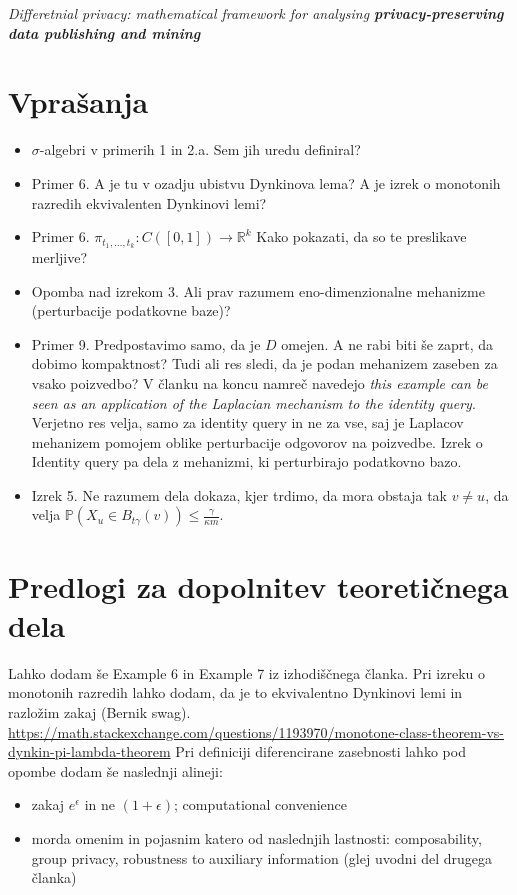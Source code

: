 \documentclass[a4paper]{article}
\theoremstyle{definition}
\begin{document}
\textit{Differetnial privacy: mathematical framework for analysing \textbf{privacy-preserving data publishing and mining}}


\section{Vprašanja}
\begin{itemize}
\item $\sigma$-algebri v primerih 1 in 2.a. Sem jih uredu definiral?
\item Primer 6. A je tu v ozadju ubistvu Dynkinova lema? A je izrek o monotonih razredih ekvivalenten Dynkinovi lemi?
\item Primer 6.  $ \pi _{t_1,\ldots,t_k}: C([0,1]) \rightarrow \mathbb{R}^k$ Kako pokazati, da so te preslikave merljive?
\item Opomba nad izrekom 3. Ali prav razumem eno-dimenzionalne mehanizme (perturbacije podatkovne baze)?
\item Primer 9. Predpostavimo samo, da je $D$ omejen. A ne rabi biti še zaprt, da dobimo kompaktnost?  Tudi ali res sledi, da je podan mehanizem zaseben za vsako poizvedbo? V članku na koncu namreč navedejo \textit{this example can be seen as an application of the Laplacian mechanism to the identity query}. Verjetno res velja, samo za identity query in ne za vse, saj je Laplacov mehanizem pomojem oblike perturbacije odgovorov na poizvedbe. Izrek o Identity query pa dela z mehanizmi, ki perturbirajo podatkovno bazo.
\item Izrek 5. Ne razumem dela dokaza, kjer trdimo, da mora obstaja tak $v \neq u$, da velja $\mathbb{P}(X_u \in B_{t\gamma}(v)) \leq \frac{\gamma}{\kappa m}.$ 
\end{itemize}

\section{Predlogi za dopolnitev teoretičnega dela}
Lahko dodam še Example 6 in Example 7 iz izhodiščnega članka.
\newline
\newline
Pri izreku o monotonih razredih lahko dodam, da je to ekvivalentno Dynkinovi lemi in razložim zakaj (Bernik swag).
\newline
\url{https://math.stackexchange.com/questions/1193970/monotone-class-theorem-vs-dynkin-pi-lambda-theorem}
\newline
\newline
Pri definiciji diferencirane zasebnosti lahko pod opombe dodam še naslednji alineji:
\begin{itemize}
\item zakaj $e^\epsilon$ in ne $(1+\epsilon)$; computational convenience 
\item morda omenim in pojasnim katero od naslednjih lastnosti: composability, group privacy, robustness to auxiliary information (glej uvodni del drugega članka) 
\end{itemize}
\end{document}
